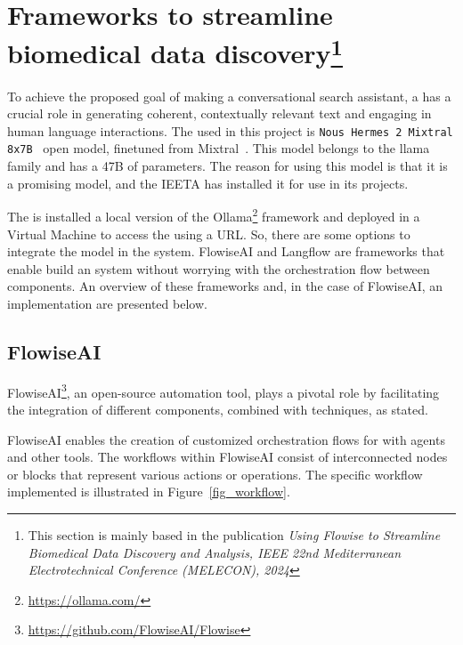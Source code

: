 \section{Frameworks to streamline biomedical data discovery\protect\footnote{This section is mainly based in the publication \textit{Using Flowise to Streamline Biomedical Data Discovery and Analysis, IEEE 22nd Mediterranean Electrotechnical Conference (MELECON), 2024}}}


To achieve the proposed goal of making a conversational search assistant, a {\llm} has a crucial role in generating coherent, contextually relevant text and engaging in human language interactions. The {\llm} used in this project is \texttt{Nous Hermes 2 Mixtral 8x7B}~\cite{Nous-Hermes-2-Mixtral-8x7B-DPO} open model, finetuned from Mixtral~\cite{jiang2024a}. This model belongs to the llama family and has a 47B of parameters. The reason for using this {\llm} model is that it is a promising model, and the IEETA has installed it for use in its projects.

The {\llm} is installed a local version of the Ollama\footnote{\url{https://ollama.com/}} framework and deployed in a Virtual Machine to access the {\llm} using a URL. So, there are some options to integrate the model in the system. FlowiseAI and Langflow are frameworks that enable build an {\llm} system without worrying with the orchestration flow between components. An overview of these frameworks and, in the case of FlowiseAI, an implementation are presented below.



\subsection{FlowiseAI}
\label{flowise}

FlowiseAI\footnote{\url{https://github.com/FlowiseAI/Flowise}}, an open-source automation tool, plays a pivotal role by facilitating the integration of different {\ai} components, combined with {\ir} techniques, as \citet{reis2024flowise} stated.

FlowiseAI enables the creation of customized orchestration flows for {\llm} with {\ai} agents and other tools. The workflows within FlowiseAI consist of interconnected nodes or blocks that represent various actions or operations. The specific workflow implemented is illustrated in Figure~\ref{fig_workflow}.



